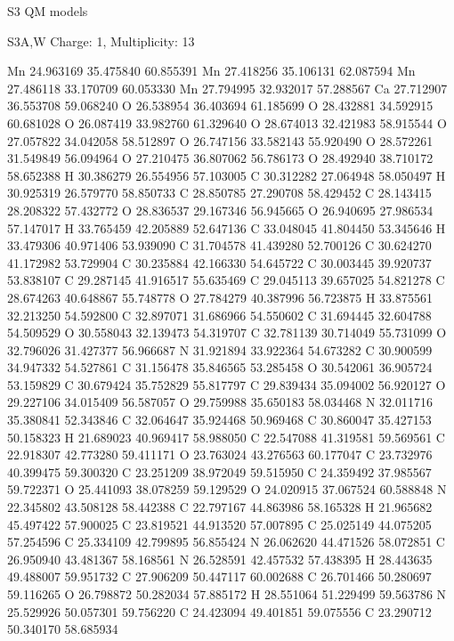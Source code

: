 \documentclass{article}
\begin{document}
S3 QM models   
    
S3A,W   Charge: 1, Multiplicity: 13     
    
Mn 24.963169 35.475840 60.855391 
Mn 27.418256 35.106131 62.087594 
Mn 27.486118 33.170709 60.053330 
Mn 27.794995 32.932017 57.288567 
Ca 27.712907 36.553708 59.068240 
O 26.538954 36.403694 61.185699 
O 28.432881 34.592915 60.681028 
O 26.087419 33.982760 61.329640 
O 28.674013 32.421983 58.915544 
O 27.057822 34.042058 58.512897 
O 26.747156 33.582143 55.920490 
O 28.572261 31.549849 56.094964 
O 27.210475 36.807062 56.786173 
O 28.492940 38.710172 58.652388 
H 30.386279 26.554956 57.103005 
C 30.312282 27.064948 58.050497 
H 30.925319 26.579770 58.850733 
C 28.850785 27.290708 58.429452 
C 28.143415 28.208322 57.432772 
O 28.836537 29.167346 56.945665 
O 26.940695 27.986534 57.147017 
H 33.765459 42.205889 52.647136 
C 33.048045 41.804450 53.345646 
H 33.479306 40.971406 53.939090 
C 31.704578 41.439280 52.700126 
C 30.624270 41.172982 53.729904 
C 30.235884 42.166330 54.645722 
C 30.003445 39.920737 53.838107 
C 29.287145 41.916517 55.635469 
C 29.045113 39.657025 54.821278 
C 28.674263 40.648867 55.748778 
O 27.784279 40.387996 56.723875 
H 33.875561 32.213250 54.592800 
C 32.897071 31.686966 54.550602 
C 31.694445 32.604788 54.509529 
O 30.558043 32.139473 54.319707 
C 32.781139 30.714049 55.731099 
O 32.796026 31.427377 56.966687 
N 31.921894 33.922364 54.673282 
C 30.900599 34.947332 54.527861 
C 31.156478 35.846565 53.285458 
O 30.542061 36.905724 53.159829 
C 30.679424 35.752829 55.817797 
C 29.839434 35.094002 56.920127 
O 29.227106 34.015409 56.587057 
O 29.759988 35.650183 58.034468 
N 32.011716 35.380841 52.343846 
C 32.064647 35.924468 50.969468 
C 30.860047 35.427153 50.158323 
H 21.689023 40.969417 58.988050 
C 22.547088 41.319581 59.569561 
C 22.918307 42.773280 59.411171 
O 23.763024 43.276563 60.177047 
C 23.732976 40.399475 59.300320 
C 23.251209 38.972049 59.515950 
C 24.359492 37.985567 59.722371 
O 25.441093 38.078259 59.129529 
O 24.020915 37.067524 60.588848 
N 22.345802 43.508128 58.442388 
C 22.797167 44.863986 58.165328 
H 21.965682 45.497422 57.900025 
C 23.819521 44.913520 57.007895 
C 25.025149 44.075205 57.254596 
C 25.334109 42.799895 56.855424 
N 26.062620 44.471526 58.072851 
C 26.950940 43.481367 58.168561 
N 26.528591 42.457532 57.438395 
H 28.443635 49.488007 59.951732 
C 27.906209 50.447117 60.002688 
C 26.701466 50.280697 59.116265 
O 26.798872 50.282034 57.885172 
H 28.551064 51.229499 59.563786 
N 25.529926 50.057301 59.756220 
C 24.423094 49.401851 59.075556 
C 23.290712 50.340170 58.685934 
\end{document}
